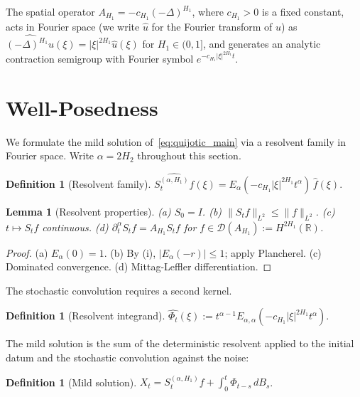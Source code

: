 \documentclass[11pt]{article}
\newtheorem{lemma}[theorem]{Lemma}
\theoremstyle{definition}
\newtheorem{definition}[theorem]{Definition}
\theoremstyle{remark}
\newcommand{\R}{\mathbb{R}}
\newcommand{\DD}{\mathcal{D}}
\newcommand{\norm}[1]{\| #1 \|}
\begin{document}
The spatial operator
$A_{H_1} = -c_{H_1}(-\Delta)^{H_1}$, where
$c_{H_1} > 0$ is a fixed constant, acts in Fourier
space (we write $\hat{u}$ for the Fourier transform
of $u$) as
$\widehat{(-\Delta)^{H_1} u}(\xi)
= |\xi|^{2H_1} \hat{u}(\xi)$ for
$H_1 \in (0,1]$, and generates an analytic contraction
semigroup with Fourier symbol
$e^{-c_{H_1}|\xi|^{2H_1} t}$.

\section{Well-Posedness}\label{sec:wellposed}

We formulate the mild solution
of~\eqref{eq:quijotic_main} via a resolvent family
in Fourier space.  Write $\alpha = 2H_2$ throughout
this section.

\begin{definition}[Resolvent family]\label{def:resolvent}
$\widehat{S_t^{(\alpha, H_1)} f}(\xi) = E_\alpha(-c_{H_1}|\xi|^{2H_1} t^\alpha)\,\hat{f}(\xi)$.
\end{definition}

\begin{lemma}[Resolvent properties]\label{lem:resolvent_props}
(a) $S_0 = I$. (b) $\norm{S_t f}_{L^2} \leq \norm{f}_{L^2}$. (c) $t \mapsto S_t f$ continuous. (d) $\partial_t^\alpha S_t f = A_{H_1} S_t f$ for $f \in \DD(A_{H_1}) := H^{2H_1}(\R)$.
\end{lemma}

\begin{proof}
(a) $E_\alpha(0) = 1$. (b) By (i), $|E_\alpha(-r)| \leq 1$; apply Plancherel. (c) Dominated convergence. (d) Mittag-Leffler differentiation.
\end{proof}

The stochastic convolution requires a second kernel.

\begin{definition}[Resolvent integrand]\label{def:resolvent_kernel}
$\widehat{\Phi_t}(\xi) := t^{\alpha-1} E_{\alpha,\alpha}(-c_{H_1}|\xi|^{2H_1} t^\alpha)$.
\end{definition}

The mild solution is the sum of the deterministic
resolvent applied to the initial datum and the
stochastic convolution against the noise:

\begin{definition}[Mild solution]\label{def:mild}
$X_t = S_t^{(\alpha, H_1)} f + \int_0^t \Phi_{t-s}\, dB_s$.
\end{definition}
\end{document}

